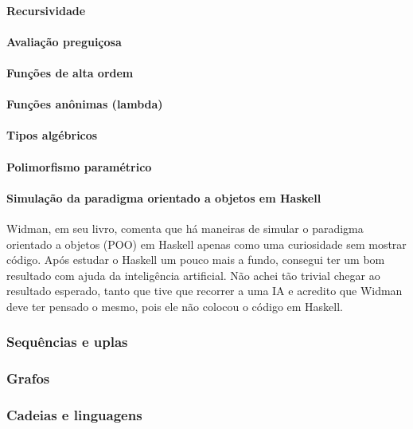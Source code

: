 \documentclass[a4paper,12pt]{article}
\begin{document}
\paragraph{Recursividade}
\paragraph{Avaliação preguiçosa}
\paragraph{Funções de alta ordem}
\paragraph{Funções anônimas (lambda)}
\paragraph{Tipos algébricos}
\paragraph{Polimorfismo paramétrico}

\paragraph{Simulação da paradigma orientado a objetos em Haskell} Widman, em seu livro, comenta que há maneiras de simular o paradigma orientado a objetos (POO) em Haskell apenas como uma curiosidade sem mostrar código. Após estudar o Haskell um pouco mais a fundo, consegui ter um bom resultado com ajuda
da inteligência artificial. Não achei tão trivial chegar ao resultado esperado, tanto que tive que recorrer a uma IA e acredito que Widman deve ter pensado o mesmo, pois ele não colocou o código em Haskell.


\subsubsection{Sequências e uplas} %
\subsubsection{Grafos} %
\subsubsection{Cadeias e linguagens} %
\end{document}

